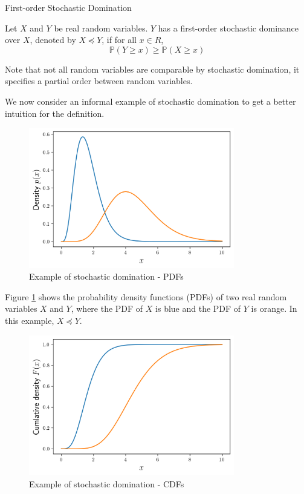 \begin{definition}
	First-order Stochastic Domination

	\noindent
	Let $X$ and $Y$ be real random variables. $Y$ has a first-order stochastic dominance over $X$, denoted by $X \preceq Y$, if for all $x \in R$, 
	$$
		\mathbb{P}(Y \geq x) \geq \mathbb{P}(X \geq x)
	$$
\end{definition}

Note that not all random variables are comparable by stochastic domination, it specifies a partial order between random variables. %

We now consider an informal example of stochastic domination to get a better intuition for the definition.

\begin{figure}[h]
	\centering
	\includegraphics[width=0.8\textwidth]{./figures/stochastic_domination_pdf.png}
	\caption{Example of stochastic domination - PDFs}
	\label{fig:stochDomPDFs}
\end{figure}

Figure \ref{fig:stochDomPDFs} shows the probability density functions (PDFs) of two real random variables $X$ and $Y$, where the PDF of $X$ is blue and the PDF of $Y$ is orange. In this example, $X \preceq Y$.

\begin{figure}[h]
	\centering
	\includegraphics[width=0.8\textwidth]{./figures/stochastic_domination_cdf.png}
	\caption{Example of stochastic domination - CDFs}
	\label{fig:stochDomCDFs}
\end{figure}

